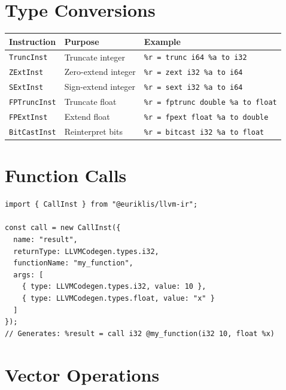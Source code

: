 \documentclass[11pt,oneside]{book}
\begin{document}
\section{Type Conversions}

\begin{longtable}{|p{3cm}|p{5cm}|p{5cm}|}
\hline
\textbf{Instruction} & \textbf{Purpose} & \textbf{Example} \\
\hline
\texttt{TruncInst} & Truncate integer & \texttt{\%r = trunc i64 \%a to i32} \\
\hline
\texttt{ZExtInst} & Zero-extend integer & \texttt{\%r = zext i32 \%a to i64} \\
\hline
\texttt{SExtInst} & Sign-extend integer & \texttt{\%r = sext i32 \%a to i64} \\
\hline
\texttt{FPTruncInst} & Truncate float & \texttt{\%r = fptrunc double \%a to float} \\
\hline
\texttt{FPExtInst} & Extend float & \texttt{\%r = fpext float \%a to double} \\
\hline
\texttt{BitCastInst} & Reinterpret bits & \texttt{\%r = bitcast i32 \%a to float} \\
\hline
\end{longtable}

\section{Function Calls}

\begin{lstlisting}[style=ts]
import { CallInst } from "@euriklis/llvm-ir";

const call = new CallInst({
  name: "result",
  returnType: LLVMCodegen.types.i32,
  functionName: "my_function",
  args: [
    { type: LLVMCodegen.types.i32, value: 10 },
    { type: LLVMCodegen.types.float, value: "x" }
  ]
});
// Generates: %result = call i32 @my_function(i32 10, float %x)
\end{lstlisting}

\section{Vector Operations}
\end{document}
